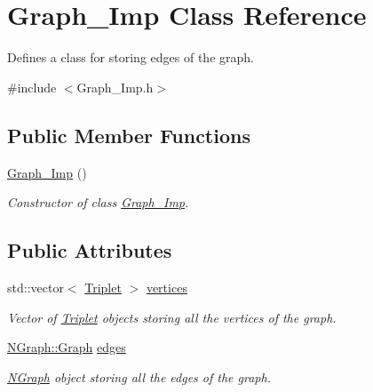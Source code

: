 \hypertarget{class_graph___imp}{}\section{Graph\+\_\+\+Imp Class Reference}
\label{class_graph___imp}


Defines a class for storing edges of the graph.  




{\ttfamily \#include $<$Graph\+\_\+\+Imp.\+h$>$}

\subsection*{Public Member Functions}
\begin{DoxyCompactItemize}
\item 
\mbox{\label{class_graph___imp_a0cc783e97aa1f84bf432c50ecff88472}} 
\mbox{\hyperlink{class_graph___imp_a0cc783e97aa1f84bf432c50ecff88472}{Graph\+\_\+\+Imp}} ()
\begin{DoxyCompactList}\small\item\em Constructor of class \mbox{\hyperlink{class_graph___imp}{Graph\+\_\+\+Imp}}. \end{DoxyCompactList}\end{DoxyCompactItemize}
\subsection*{Public Attributes}
\begin{DoxyCompactItemize}
\item 
\mbox{\label{class_graph___imp_aa361d993a6673de297e714d716ae5159}} 
std\+::vector$<$ \mbox{\hyperlink{struct_triplet}{Triplet}} $>$ \mbox{\hyperlink{class_graph___imp_aa361d993a6673de297e714d716ae5159}{vertices}}
\begin{DoxyCompactList}\small\item\em Vector of \mbox{\hyperlink{struct_triplet}{Triplet}} objects storing all the vertices of the graph. \end{DoxyCompactList}\item 
\mbox{\label{class_graph___imp_a294a280b76aaa1b518b7b77c4c717d53}} 
\mbox{\hyperlink{class_n_graph_1_1t_graph}{N\+Graph\+::\+Graph}} \mbox{\hyperlink{class_graph___imp_a294a280b76aaa1b518b7b77c4c717d53}{edges}}
\begin{DoxyCompactList}\small\item\em \mbox{\hyperlink{namespace_n_graph}{N\+Graph}} object storing all the edges of the graph. \end{DoxyCompactList}\end{DoxyCompactItemize}


